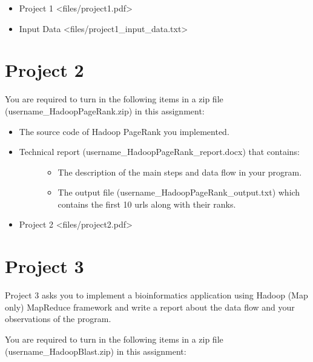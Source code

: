 \begin{itemize}
\tightlist
\item
  Project 1 \textless{}files/project1.pdf\textgreater{}
\item
  Input Data \textless{}files/project1\_input\_data.txt\textgreater{}
\end{itemize}

\chapter{Project 2}\label{project-2}

You are required to turn in the following items in a zip file
(username\_HadoopPageRank.zip) in this assignment:

\begin{itemize}
\item
  The source code of Hadoop PageRank you implemented.
\item
  \begin{description}
  \item[Technical report (username\_HadoopPageRank\_report.docx) that
  contains:]
  \begin{itemize}
  \tightlist
  \item
    The description of the main steps and data flow in your program.
  \item
    The output file (username\_HadoopPageRank\_output.txt) which
    contains the first 10 urls along with their ranks.
  \end{itemize}
  \end{description}
\item
  Project 2 \textless{}files/project2.pdf\textgreater{}
\end{itemize}

\chapter{Project 3}\label{project-3}

Project 3 asks you to implement a bioinformatics application using
Hadoop (Map only) MapReduce framework and write a report about the data
flow and your observations of the program.

You are required to turn in the following items in a zip file
(username\_HadoopBlast.zip) in this assignment:

